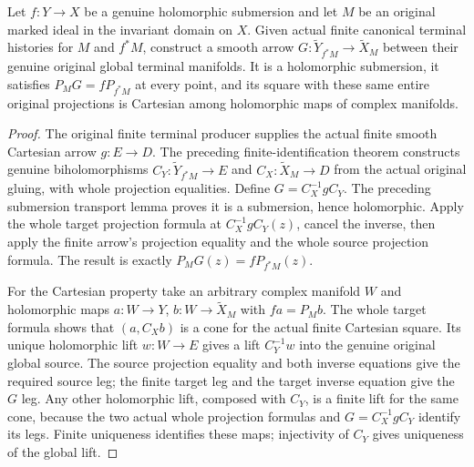 \begin{theorem}
\label{hir:original-global-finite-terminal-smooth-map-cartesian}
\leanok
{}
Let $f:Y\to X$ be a genuine holomorphic submersion and let $M$ be an original
marked ideal in the invariant domain on $X$. Given actual finite canonical
terminal histories for $M$ and $f^*M$, construct a smooth arrow
$G:\widetilde Y_{f^*M}\to\widetilde X_M$ between their genuine original global
terminal manifolds. It is a holomorphic submersion, it satisfies
$P_MG=fP_{f^*M}$ at every point, and its square with these same entire
original projections is Cartesian among holomorphic maps of complex manifolds.
\end{theorem}
\begin{proof}
The original finite terminal producer supplies the actual finite smooth
Cartesian arrow $g:E\to D$. The preceding finite-identification theorem
constructs genuine biholomorphisms $C_Y:\widetilde Y_{f^*M}\to E$ and
$C_X:\widetilde X_M\to D$ from the actual original gluing, with whole
projection equalities. Define $G=C_X^{-1}gC_Y$. The preceding submersion
transport lemma proves it is a submersion, hence holomorphic. Apply the
whole target projection formula at $C_X^{-1}gC_Y(z)$, cancel the inverse,
then apply the finite arrow's projection equality and the whole source
projection formula. The result is exactly $P_MG(z)=fP_{f^*M}(z)$.

For the Cartesian property take an arbitrary complex manifold $W$ and
holomorphic maps $a:W\to Y$, $b:W\to\widetilde X_M$ with $fa=P_Mb$.
The whole target formula shows that $(a,C_Xb)$ is a cone for the actual
finite Cartesian square. Its unique holomorphic lift $w:W\to E$ gives
a lift $C_Y^{-1}w$ into the genuine original global source. The source
projection equality and both inverse equations give the required source
leg; the finite target leg and the target inverse equation give the $G$
leg. Any other holomorphic lift, composed with $C_Y$, is a finite lift
for the same cone, because the two actual whole projection formulas and
$G=C_X^{-1}gC_Y$ identify its legs. Finite uniqueness identifies these
maps; injectivity of $C_Y$ gives uniqueness of the global lift.
\end{proof}


